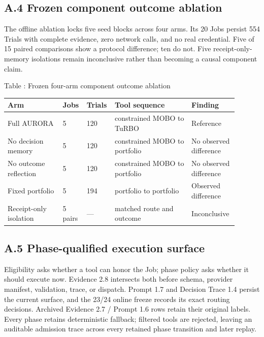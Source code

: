 \subsection{\texorpdfstring{\textbf{A.4 Frozen component outcome
ablation}}{A.4 Frozen component outcome ablation}}\label{a.4-frozen-component-outcome-ablation}

The offline ablation locks five seed blocks across four arms. Its 20 Jobs
persist 554 Trials with complete evidence, zero network calls, and no real
credential. Five of 15 paired comparisons show a protocol difference; ten
do not. Five receipt-only-memory isolations remain inconclusive rather than
becoming a causal component claim.

\begin{center}
\begingroup
\footnotesize
\renewcommand{\arraystretch}{0.94}
\textnormal{Table \thetable: Frozen four-arm component outcome ablation}\par
\vspace{0.18em}
\begin{tabular}{@{}L{0.23\linewidth}C{0.08\linewidth}C{0.10\linewidth}L{0.32\linewidth}L{0.17\linewidth}@{}}
\toprule
\textbf{Arm} & \textbf{Jobs} & \textbf{Trials} &
\textbf{Tool sequence} & \textbf{Finding}\tabularnewline
\midrule
Full AURORA & 5 & 120 & constrained MOBO to TuRBO & Reference\tabularnewline
No decision memory & 5 & 120 & constrained MOBO to portfolio & No observed difference\tabularnewline
No outcome reflection & 5 & 120 & constrained MOBO to portfolio & No observed difference\tabularnewline
Fixed portfolio & 5 & 194 & portfolio to portfolio & Observed difference\tabularnewline
Receipt-only isolation & 5 pairs & --- & matched route and outcome & Inconclusive\tabularnewline
\bottomrule
\end{tabular}
\endgroup
\end{center}

\subsection{\texorpdfstring{\textbf{A.5 Phase-qualified execution
surface}}{A.5 Phase-qualified execution surface}}\label{a.5-phase-qualified-execution-surface}

Eligibility asks whether a tool can honor the Job; phase policy asks
whether it should execute now. Evidence 2.8 intersects both before schema,
provider manifest, validation, trace, or dispatch. Prompt 1.7 and Decision
Trace 1.4 persist the current surface, and the 23/24 online freeze records
its exact routing decisions. Archived Evidence 2.7 / Prompt 1.6 rows
retain their original labels. Every phase retains deterministic fallback;
filtered tools are rejected, leaving an auditable admission trace across
every retained phase transition and later replay.

